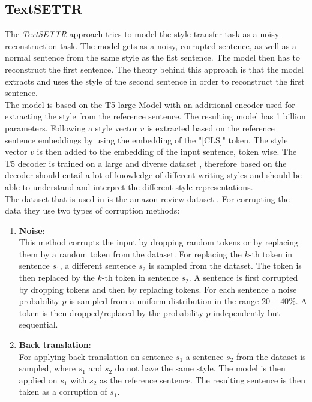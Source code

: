 \documentclass[twocolumn]{tum-article}
\begin{document}
\subsection{TextSETTR} \label{sec:textsettr}
The \textit{TextSETTR} \cite{riley2020textsettr} approach tries to model the style transfer task as a noisy reconstruction task. The model gets as a noisy, corrupted sentence, as well as a normal sentence from the same style as the fist sentence. The model then has to reconstruct the first sentence. The theory behind this approach is that the model extracts and uses the style of the second sentence in order to reconstruct the first sentence.\\
The model is based on the T5 large Model with an additional encoder used for extracting the style from the reference sentence. The resulting model has 1 billion parameters. Following \cite{devlin-etal-2019-bert, raffel2019exploring} a style vector $v$ is extracted based on the reference sentence embeddings by using the embedding of the "[CLS]" token. The style vector $v$ is then added to the embedding of the input sentence, token wise. The T5 decoder is trained on a large and diverse dataset \cite{raffel2019exploring}, therefore based on \cite{riley2020textsettr} the decoder should entail a lot of knowledge of different writing styles and should be able to understand and interpret the different style representations.\\
The dataset that is used in \cite{riley2020textsettr} is the amazon review dataset \cite{li2018delete}. For corrupting the data they use two types of corruption methods:
\begin{enumerate}
\item \textbf{Noise}:\\
This method corrupts the input by dropping random tokens or by replacing them by a random token from the dataset. For replacing the $k$-th token in sentence $s_1$, a different sentence $s_2$ is sampled from the dataset. The token is then replaced by the $k$-th token in sentence $s_2$. A sentence is first corrupted by dropping tokens and then by replacing tokens. For each sentence a noise probability $p$ is sampled from a uniform distribution in the range $20-40\%$. A token is then dropped/replaced by the probability $p$ independently but sequential.
\item \textbf{Back translation}:\\
For applying back translation on sentence $s_1$ a sentence $s_2$ from the dataset is sampled, where $s_1$ and $s_2$ do not have the same style. The model is then applied on $s_1$ with $s_2$ as the reference sentence. The resulting sentence is then taken as a corruption of $s_1$. 
\end{enumerate}
\end{document}
